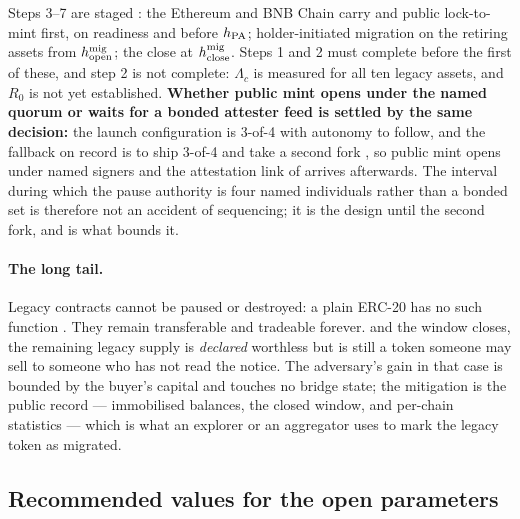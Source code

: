\noindent Steps 3--7 are staged : the Ethereum and BNB Chain
carry and public lock-to-mint first, on readiness and before $h_{\mathrm{PA}}$; holder-initiated migration on
the retiring assets from $h^{\mathrm{mig}}_{\mathrm{open}}$; the close at $h^{\mathrm{mig}}_{\mathrm{close}}$. Steps 1 and 2 must complete before the
first of these, and step 2 is not complete: $\Lambda_c$ is measured
for all ten legacy assets, and $R_0$ is not yet established. \textbf{Whether public mint opens under the named quorum or waits for a bonded
attester feed is settled by the same decision:} the launch configuration is 3-of-4 with autonomy to
follow, and the fallback on record is to ship 3-of-4 and take a second fork
, so public mint opens under named signers and the attestation link
of  arrives afterwards. The interval during which the pause authority
is four named individuals rather than a bonded set is therefore not an accident of sequencing; it is
the design until the second fork, and  is what bounds it.

\paragraph{The long tail.} Legacy contracts cannot be paused or destroyed: a plain ERC-20 has no
such function . They remain transferable and tradeable forever.
 and the window closes, the remaining legacy supply is
\emph{declared} worthless but is still a token someone may sell to someone who has not read the
notice. The adversary's gain in that case is bounded by the buyer's capital and touches no bridge
state; the mitigation is the public record --- immobilised balances, the closed window, and per-chain
statistics --- which is what an explorer or an aggregator uses to mark the legacy token as migrated.

\subsection{Recommended values for the open parameters}
\label{sec:22:recommended}

